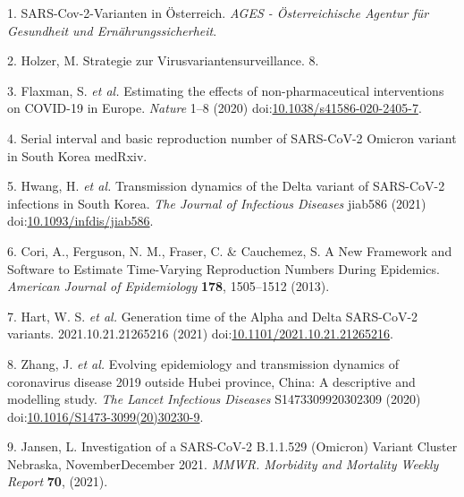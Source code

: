 \documentclass[
]{article}
\begin{document}
\hypertarget{refs}{}
\leavevmode\hypertarget{ref-SARSCov2VariantenOesterreich}{}%
1. SARS-Cov-2-Varianten in Österreich. \emph{AGES - Österreichische Agentur für Gesundheit und Ernährungssicherheit}.

\leavevmode\hypertarget{ref-holzerStrategieZurVirusvariantensurveillance}{}%
2. Holzer, M. Strategie zur Virusvariantensurveillance. 8.

\leavevmode\hypertarget{ref-flaxmanEstimatingEffectsNonpharmaceutical2020}{}%
3. Flaxman, S. \emph{et al.} Estimating the effects of non-pharmaceutical interventions on COVID-19 in Europe. \emph{Nature} 1--8 (2020) doi:\href{https://doi.org/10.1038/s41586-020-2405-7}{10.1038/s41586-020-2405-7}.

\leavevmode\hypertarget{ref-SerialIntervalBasic}{}%
4. Serial interval and basic reproduction number of SARS-CoV-2 Omicron variant in South Korea \textbar{} medRxiv.

\leavevmode\hypertarget{ref-hwangTransmissionDynamicsDelta2021}{}%
5. Hwang, H. \emph{et al.} Transmission dynamics of the Delta variant of SARS-CoV-2 infections in South Korea. \emph{The Journal of Infectious Diseases} jiab586 (2021) doi:\href{https://doi.org/10.1093/infdis/jiab586}{10.1093/infdis/jiab586}.

\leavevmode\hypertarget{ref-coriNewFrameworkSoftware2013}{}%
6. Cori, A., Ferguson, N. M., Fraser, C. \& Cauchemez, S. A New Framework and Software to Estimate Time-Varying Reproduction Numbers During Epidemics. \emph{American Journal of Epidemiology} \textbf{178}, 1505--1512 (2013).

\leavevmode\hypertarget{ref-hartGenerationTimeAlpha2021}{}%
7. Hart, W. S. \emph{et al.} Generation time of the Alpha and Delta SARS-CoV-2 variants. 2021.10.21.21265216 (2021) doi:\href{https://doi.org/10.1101/2021.10.21.21265216}{10.1101/2021.10.21.21265216}.

\leavevmode\hypertarget{ref-zhangEvolvingEpidemiologyTransmission2020}{}%
8. Zhang, J. \emph{et al.} Evolving epidemiology and transmission dynamics of coronavirus disease 2019 outside Hubei province, China: A descriptive and modelling study. \emph{The Lancet Infectious Diseases} S1473309920302309 (2020) doi:\href{https://doi.org/10.1016/S1473-3099(20)30230-9}{10.1016/S1473-3099(20)30230-9}.

\leavevmode\hypertarget{ref-jansenInvestigationSARSCoV25292021}{}%
9. Jansen, L. Investigation of a SARS-CoV-2 B.1.1.529 (Omicron) Variant Cluster Nebraska, NovemberDecember 2021. \emph{MMWR. Morbidity and Mortality Weekly Report} \textbf{70}, (2021).
\end{document}
